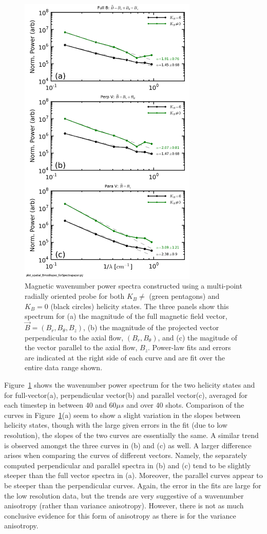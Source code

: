 \documentclass[aip,prl,amsmath,amssymb,reprint,superscriptaddress]{revtex4-1} %
\begin{document}
\begin{figure}[!htbp]
\centerline{
\includegraphics[width=8.5cm]{Bmod_FFTwavenumberspectra_wFits_40t60us}}
\caption{\label{fig:wavenumber_spectra} Magnetic wavenumber power spectra constructed using a multi-point radially oriented probe for both $K_{B}\neq$ (green pentagons) and $K_{B}=0$ (black circles) helicity states. The three panels show this spectrum for (a) the magnitude of the full magnetic field vector, $\vec{B} = (B_{r},B_{\theta},B_{z})$, (b) the magnitude of the projected vector perpendicular to the axial flow, $(B_{r},B_{\theta})$, and (c) the magitude of the vector parallel to the axial flow, $B_{z}$. Power-law fits and errors are indicated at the right side of each curve and are fit over the entire data range shown.}
\end{figure}

Figure~\ref{fig:wavenumber_spectra} shows the wavenumber power spectrum for the two helicity states and for full-vector(a), perpendicular vector(b) and parallel vector(c), averaged for each timestep in between 40 and 60$\mu s$ and over 40 shots. Comparison of the curves in Figure~\ref{fig:wavenumber_spectra}(a) seem to show a slight variation in the slopes between helicity states, though with the large given errors in the fit (due to low resolution), the slopes of the two curves are essentially the same. A similar trend is observed amongst the three curves in (b) and (c) as well. A larger difference arises when comparing the curves of different vectors. Namely, the separately computed perpendicular and parallel spectra in (b) and (c) tend to be slightly steeper than the full vector spectra in (a). Moreover, the parallel curves appear to be steeper than the perpendicular curves. Again, the error in the fits are large for the low resolution data, but the trends are very suggestive of a wavenumber anisotropy (rather than variance anisotropy). However, there is not as much conclusive evidence for this form of anisotropy as there is for the variance anisotropy.
\end{document}
